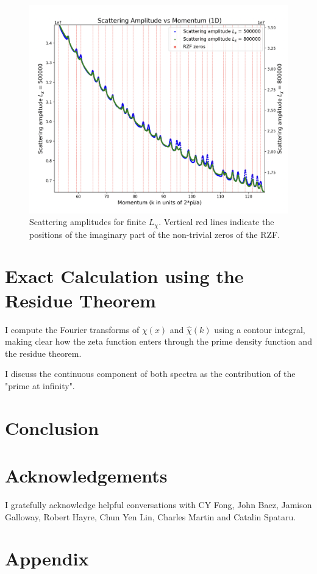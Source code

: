 \documentclass[11pt, oneside]{article}   	%
\begin{document}
\begin{figure}[htbp]
\begin{center}
    \includegraphics[width=0.8\linewidth]{../images/zoomed_scattering.png}
   
\caption{Scattering amplitudes for finite $L_{\chi}$. Vertical red lines indicate the positions of the imaginary part of the non-trivial zeros of the RZF.}
\label{default}
\end{center}
\end{figure}
 
\section{Exact Calculation using the Residue Theorem}

I compute the Fourier transforms of $\chi(x)$ and $\hat{\chi}(k)$ using a contour integral, making clear how the zeta function enters through the prime density function and the residue theorem.

I discuss the continuous component of both spectra as the contribution of the "prime at infinity".





\section{Conclusion}
\section{Acknowledgements}
I gratefully acknowledge helpful conversations with CY Fong, John Baez, Jamison Galloway, Robert Hayre, Chun Yen Lin, Charles Martin and Catalin Spataru.
\section{Appendix}
\end{document}
